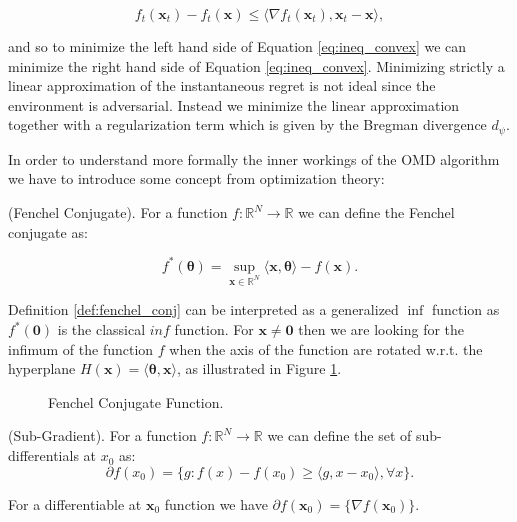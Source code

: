 \begin{equation}\label{eq:ineq_convex}
f_t(\mathbf x_t)-f_t(\mathbf x)\le\langle\nabla f_t(\mathbf x_t),\mathbf x_t-\mathbf x\rangle,
\end{equation}

and so to minimize the left hand side of Equation \eqref{eq:ineq_convex} we can minimize the right hand side of Equation \eqref{eq:ineq_convex}. Minimizing strictly a linear approximation of the instantaneous regret is not ideal since the environment is adversarial. Instead we minimize the linear approximation together with a regularization term which is given by the Bregman divergence $d_\psi$.

In order to understand more formally the inner workings of the OMD algorithm we have to introduce some concept from optimization theory:

\begin{definition}(Fenchel Conjugate).\label{def:fenchel_conj}
For a function $f:\mathbb R^N\to\mathbb R$ we can define the Fenchel conjugate as:

\begin{equation}
f^*(\mathbf \theta)=\sup\limits_{\mathbf x\in\mathbb R^N}\langle\mathbf x,\mathbf \theta\rangle -f(\mathbf x).
\end{equation}
\end{definition}

Definition \ref{def:fenchel_conj} can be interpreted as a generalized $\inf$ function as $f^*(\mathbf 0)$ is the classical $inf$ function. For $\mathbf x\neq\mathbf 0$ then we are looking for the infimum of the function $f$ when the axis of the function are rotated w.r.t. the hyperplane $H(\mathbf x)=\langle\mathbf\theta,\mathbf x\rangle$, as illustrated in Figure \ref{fig:fenchel}.

\begin{figure}[!ht]
\centering

\caption{Fenchel Conjugate Function.}
\label{fig:fenchel}
\end{figure}


\begin{definition}(Sub-Gradient).\label{def:subgradient}
For a function $f:\mathbb R^N\to\mathbb R$ we can define the set of sub-differentials at $x_0$ as:
\begin{equation}
\partial f(x_0) = \{g : f(x)-f(x_0) \ge \langle g, x - x_0\rangle,\forall x\}.
\end{equation}
\end{definition}

For a differentiable at $\mathbf x_0$ function we have $\partial f(\mathbf x_0)=\{\nabla f(\mathbf x_0)\}$.

